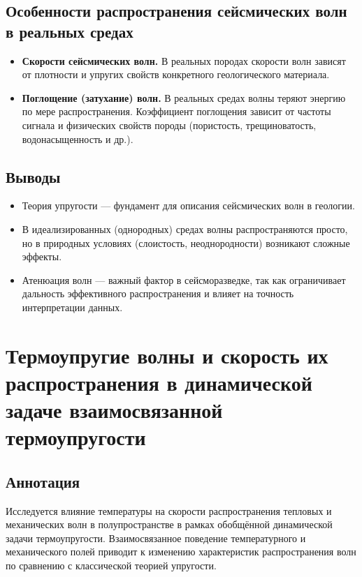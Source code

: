 \subsection*{Особенности распространения сейсмических волн в реальных средах}  
\begin{itemize}  
  \item \textbf{Скорости сейсмических волн.} В реальных породах скорости волн зависят от плотности и упругих свойств конкретного геологического материала.  
  \item \textbf{Поглощение (затухание) волн.} В реальных средах волны теряют энергию по мере распространения. Коэффициент поглощения зависит от частоты сигнала и физических свойств породы (пористость, трещиноватость, водонасыщенность и др.).  
\end{itemize}

\subsection*{Выводы}  
\begin{itemize}
    \item Теория упругости — фундамент для описания сейсмических волн в геологии.
    \item В идеализированных (однородных) средах волны распространяются просто, но в природных условиях (слоистость, неоднородности) возникают сложные эффекты.
    \item Атенюация волн — важный фактор в сейсморазведке, так как ограничивает дальность эффективного распространения и влияет на точность интерпретации данных.
\end{itemize}


\section*{Термоупругие волны и скорость их распространения в динамической задаче взаимосвязанной термоупругости}

\author{А.Д. Шамровский, Г.В. Меркотан}

\subsection*{Аннотация}
Исследуется влияние температуры на скорости распространения тепловых и механических волн в полупространстве в рамках обобщённой динамической задачи термоупругости. Взаимосвязанное поведение температурного и механического полей приводит к изменению характеристик распространения волн по сравнению с классической теорией упругости.

